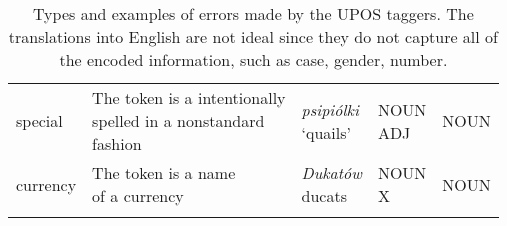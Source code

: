\begin{longtable}[H]{p{2cm}p{4.5cm}p{3.5cm}p{1.75cm}p{1.75cm}}
special & \makecell[l]{The token is a intentionally \\ spelled in a nonstandard \\ fashion} & \makecell[l]{\textit{psipiólki} \\ `quails'} & \makecell[l]{NOUN \\ ADJ} & NOUN \\ 

currency & \makecell[l]{The token is a name \\ of a currency} & \makecell[l]{\textit{Dukatów} \\ ducats} & \makecell[l]{NOUN \\ X} & NOUN \\

\bottomrule
\caption{\label{table:error-type-upos-explanations} Types and examples of errors made by the UPOS taggers. The translations into English are not ideal since they do not capture all of the encoded information, such as case, gender, number.}
\end{longtable}
\newpage

